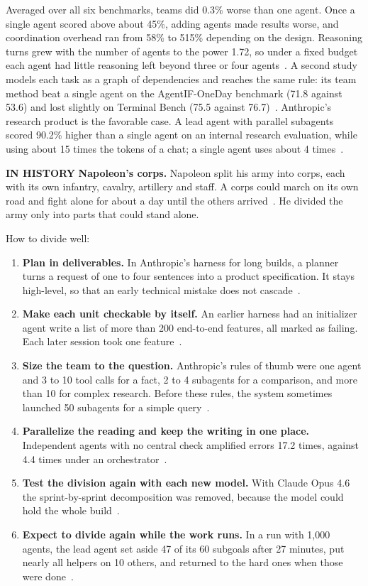 \documentclass[11pt,letterpaper]{article}
\newcommand{\histlabel}[1]{{\sffamily\fontsize{7.6}{9.6}\selectfont\bfseries\color{muted}IN HISTORY}%
  \enspace\textbf{#1}\enspace}
\begin{document}
Averaged over all six benchmarks, teams did 0.3\% worse than one agent. Once a single agent
scored above about 45\%, adding agents made results worse, and coordination overhead ran from
58\% to 515\% depending on the design. Reasoning turns grew with the number of agents to the
power 1.72, so under a fixed budget each agent had little reasoning left beyond three or four
agents~\cite{kim}. A second study models each task as a graph of
dependencies and reaches the same rule: its team method beat a single agent on the
AgentIF-OneDay benchmark (71.8 against 53.6) and lost slightly on Terminal Bench (75.5 against
76.7)~\cite{yuan}. Anthropic's research product is the favorable case. A lead agent with
parallel subagents scored 90.2\% higher than a single agent on an internal research
evaluation, while using about 15 times the tokens of a chat; a single agent uses about
4 times~\cite{research}.

\begin{history}
\histlabel{Napoleon's corps.} Napoleon split his army into corps, each with its own infantry,
cavalry, artillery and staff. A corps could march on its own road and fight alone for about a
day until the others arrived~\cite{chandler}. He divided the army only into parts that could
stand alone.
\end{history}

How to divide well:

\begin{enumerate}[leftmargin=1.5em]
  \item \textbf{Plan in deliverables.} In Anthropic's harness for long builds, a planner turns
        a request of one to four sentences into a product specification. It stays high-level,
        so that an early technical mistake does not cascade~\cite{harness}.
  \item \textbf{Make each unit checkable by itself.} An earlier harness had an initializer
        agent write a list of more than 200 end-to-end features, all marked as failing. Each
        later session took one feature~\cite{longrun}.
  \item \textbf{Size the team to the question.} Anthropic's rules of thumb were one agent and
        3 to 10 tool calls for a fact, 2 to 4 subagents for a comparison, and more than 10 for
        complex research. Before these rules, the system sometimes launched 50 subagents for a
        simple query~\cite{research}.
  \item \textbf{Parallelize the reading and keep the writing in one place.} Independent agents
        with no central check amplified errors 17.2 times, against 4.4 times under an
        orchestrator~\cite{kim}.
  \item \textbf{Test the division again with each new model.} With Claude Opus 4.6 the
        sprint-by-sprint decomposition was removed, because the model could hold the whole
        build~\cite{harness}.
  \item \textbf{Expect to divide again while the work runs.} In a run with 1,000 agents, the
        lead agent set aside 47 of its 60 subgoals after 27 minutes, put nearly all helpers on
        10 others, and returned to the hard ones when those were done~\cite{fermat}.
\end{enumerate}
\end{document}
